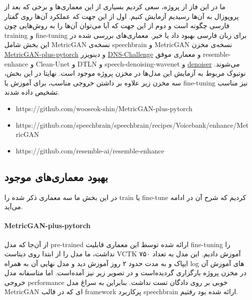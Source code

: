 \documentclass[fleqn]{report}
\begin{document}
ما در این فاز از پروژه، سعی کردیم بسیاری از این معماری‌ها و برخی که بعد از پروپوزال به آن‌ها رسیدیم آزمایش کنیم.
اول از این جهت که عملکرد آن‌ها روی گفتار فارسی چگونه است و دوم از این جهت که آیا می‌توان آن‌ها را به روش‌هایی چون training و fine-tuning برای زبان فارسی بهبود داد یا خیر.
معماری‌های بررسی شده در این بخش شامل 
MetricGAN نسخه‌ی speechbrain و MetricGAN نسخه‌ی مخزن \href{https://github.com/wooseok-shin/MetricGAN-plus-pytorch}{MetricGAN-plus-pytorch}
و 
دینویزر \href{https://github.com/microsoft/DNS-Challenge}{DNS-Challenge}
و 
معماری موفق resemble-enhance
و 
Clean-Unet
 و DTLN
 و 
 speech-denoising-wavenet
 و
 \href{https://github.com/facebookresearch/denoiser}{denoiser} 
 می‌شوند.
 نوتبوک مربوط به آزمایش این مدل‌ها در مخزن پروژه موجود است.
نهایتا در این بخش، سه مخزن 
زیر علاوه بر داشتن خروجی مناسب، برای آموزش یا fine-tuning نیز مناسب تشخیص داده شدند.

\begin{itemize}
    \item https://github.com/wooseok-shin/MetricGAN-plus-pytorch
    \item https://github.com/speechbrain/speechbrain/recipes/Voicebank/enhance/MetricGAN
    \item https://github.com/resemble-ai/resemble-enhance
\end{itemize}

\subsection{بهبود معماری‌های موجود}
در این بخش ما سه معماری ذکر شده را train یا fine-tune کردیم که شرح آن در ادامه می‌آید.

\paragraph{MetricGAN-plus-pytorch}
از آن‌جا که مدل pre-trained ارائه شده توسط این معماری قابلیت fine-tuning را نداشت، ما مدل را از ابتدا روی دیتاست VCTK آموزش دادیم.
این مدل به تعداد ۷۵۰ ایپاک و به مدت حدود ۲ روز آموزش دید و مدل نهایی آن به همراه log های آموزش آن در مخزن پروژه بارگزاری گردیده‌است و در تصویر زیر نیز آمده‌است.
اما متاسفانه مدل خروجی performance خوبی بر روی دادگان تست نداشت. بنابراین به سراغ مدل MetricGAN ای که در قالب framework پرکاربرد speechbrain ارائه شده بود رفتیم.
\end{document}
